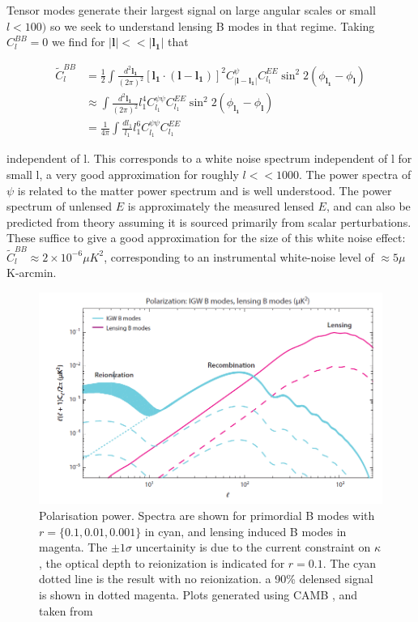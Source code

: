 \documentclass[a4paper,10pt]{article}
\renewcommand{\v}[1]{\mathbf{#1}}
\newcommand{\half}{\frac{1}{2}}
\newcommand{\finttwo}[1]{\int \frac{d^2 \v{#1}}{(2\pi)^2}}
\begin{document}
Tensor modes generate their largest signal on large angular scales or small $l<100)$ so we seek to understand lensing B modes in that regime. Taking $C_l^{BB}=0$ we find for $|\v{l}| << |\v{l_1}|$ that 

\begin{equation}\begin{split}
\tilde{C}_l^{BB} &= \half \finttwo{l_1}[ \v{l_1}\cdot(\v{l}-\v{l_1})]^2 C^\psi_{|\v{l}-\v{l_1}|}C_{l_1}^{EE}\sin^2{2(\phi_\v{l_1}-\phi_\v{l})}\\
&\approx \finttwo{l_1} l_1^4C^{\psi\psi}_{l_1}C^{EE}_{l_1}\sin^2{2(\phi_\v{l_1}-\phi_\v{l})}\\
&=\frac{1}{4\pi}\int \frac{dl_1}{l_1}l_1^6C^{\psi\psi}_{l_1}C^{EE}_{l_1}
\end{split}\end{equation}

independent of l. This corresponds to a white noise spectrum independent of l for small l, a very good approximation for roughly $l<<1000$. The power spectra of $\psi$ is related to the matter power spectrum and is well understood. The power spectrum of unlensed $E$ is approximately the measured lensed $E$, and can also be predicted from theory assuming it is sourced primarily from scalar perturbations. These suffice to give a good approximation for the size of this white noise effect: $\tilde{C}_l^{BB} \approx 2\times10^{-6}\mu K^2$, corresponding to an instrumental white-noise level of $\approx 5\mu$K-arcmin.\\

\begin{figure}[h]
  \includegraphics[width=\linewidth]{lensingfucksus.png}
  \caption{Polarisation power. Spectra are shown for primordial B modes with $r=\{0.1,0.01,0.001\}$ in cyan, and lensing induced B modes in magenta. The $\pm1\sigma$ uncertainity is due to the current constraint on $\kappa$, the optical depth to reionization is indicated for $r=0.1$. The cyan dotted line is the result with no reionization. a 90\% delensed signal is shown in dotted magenta. Plots generated using CAMB \cite{CAMBInfo}, and taken from \cite{QBM}}
  \label{lensingisfucked}
\end{figure}
\end{document}
